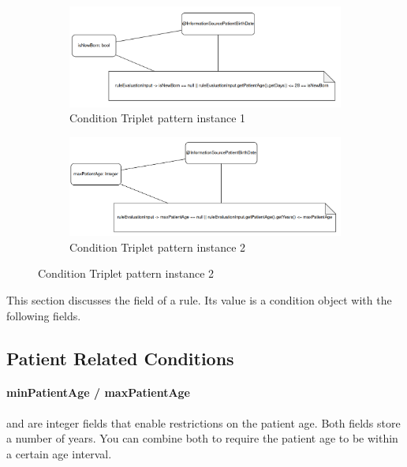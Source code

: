 \begin{figure}
    \centering
    \begin{subfigure}[b]{0.45\linewidth}
        \centering
        \includegraphics[width=\linewidth]{./figures/ctp-is-new-born}
        \caption{Condition Triplet pattern instance 1}
        \label{fig:condition-triplet-pattern-instance-1}
    \end{subfigure}
    \hspace{5mm} %
    \begin{subfigure}[b]{0.45\linewidth}
        \centering
        \includegraphics[width=\linewidth]{./figures/ctp-max-patient-age}
        \caption{Condition Triplet pattern instance 2}
        \label{fig:condition-triplet-pattern-instance-2}
    \end{subfigure}
    \label{fig:coffee}
\end{figure}
This section discusses the  field of a rule.
Its value is a condition object with the following fields.

\subsection{Patient Related Conditions}\label{subsec:patient-related-conditions}

\paragraph{minPatientAge / maxPatientAge}
 and  are integer fields that enable restrictions on the patient age.
Both fields store a number of years.
You can combine both to require the patient age to be within a certain age interval.

